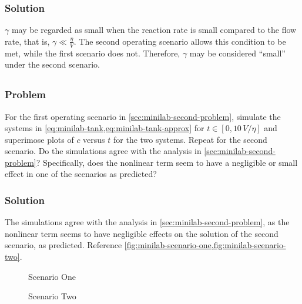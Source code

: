 \documentclass[12pt]{article}
\begin{document}
\subsubsection*{Solution}
$\gamma$ may be regarded as small when the reaction rate is small compared to
the flow rate, that is, $\gamma \ll \frac{\eta}{V}$. The second operating
scenario allows this condition to be met, while the first scenario does not.
Therefore, $\gamma$ may be considered ``small'' under the second scenario.

\subsection{}
\subsubsection*{Problem}
For the first operating scenario in \cref{sec:minilab-second-problem}, simulate
the systems in \cref{eq:minilab-tank,eq:minilab-tank-approx} for
$t\in[0,10\,V/\eta]$ and superimose plots of $c$ versus $t$ for the two systems.
Repeat for the second scenario. Do the simulations agree with the analysis in
\cref{sec:minilab-second-problem}? Specifically, does the nonlinear term seem
to have a negligible or small effect in one of the scenarios as predicted?

\subsubsection*{Solution}
The simulations agree with the analysis in \cref{sec:minilab-second-problem}, as
the nonlinear term seems to have negligible effects on the solution of the
second scenario, as predicted. Reference
\cref{fig:minilab-scenario-one,fig:minilab-scenario-two}.

  \begin{figure}
    \centering
    \caption{Scenario One}
    \scalebox{0.85}{\huge}
    \label{fig:minilab-scenario-one}
  \end{figure}

  \begin{figure}
    \centering
    \caption{Scenario Two}
    \scalebox{0.85}{\huge}
    \label{fig:minilab-scenario-two}
  \end{figure}
\end{document}
